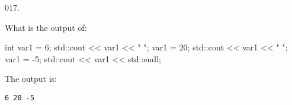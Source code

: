 \documentclass[]{book}
\newenvironment{Shaded}{}{}
\newcommand{\BuiltInTok}[1]{#1}
\newcommand{\DataTypeTok}[1]{\textcolor[rgb]{0.56,0.13,0.00}{#1}}
\newcommand{\DecValTok}[1]{\textcolor[rgb]{0.25,0.63,0.44}{#1}}
\newcommand{\NormalTok}[1]{#1}
\newcommand{\StringTok}[1]{\textcolor[rgb]{0.25,0.44,0.63}{#1}}
\begin{document}
\begin{minipage}{\linewidth}\noindent
{\tiny 017.}\\
\begin{minipage}[t]{.485\linewidth}

What is the output of:

\begin{framed}

\begin{Shaded}
\begin{Highlighting}[]
\DataTypeTok{int}\NormalTok{ var1 = }\DecValTok{6}\NormalTok{;}
\BuiltInTok{std::}\NormalTok{cout << var1 << }\StringTok{" "}\NormalTok{;}
\NormalTok{var1 = }\DecValTok{20}\NormalTok{;}
\BuiltInTok{std::}\NormalTok{cout << var1 << }\StringTok{" "}\NormalTok{;}
\NormalTok{var1 = }\DecValTok{-5}\NormalTok{;}
\BuiltInTok{std::}\NormalTok{cout << var1 << }\BuiltInTok{std::}\NormalTok{endl;}
\end{Highlighting}
\end{Shaded}

\end{framed}

\end{minipage}
\hfill
\begin{minipage}[t]{.485\linewidth}

The output is:

\begin{framed}

\begin{verbatim}
6 20 -5
\end{verbatim}

\end{framed}

\end{minipage}
\end{minipage}

\vspace{2mm}\noindent\hrulefill{}
\end{document}
